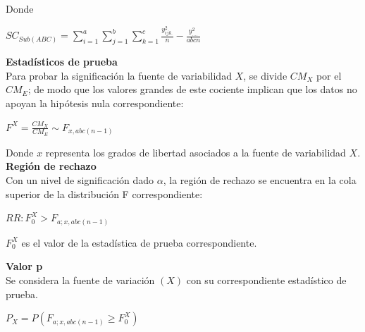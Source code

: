 Donde
\begin{center}
	$ SC_{Sub(ABC)} = \sum_{i=1}^{a}  \sum_{j=1}^{b}  \sum_{k=1}^{c} \frac{y_{ijk.}^{2}}{n} - \frac{y_{....}^{2}}{abcn}  $\\
\end{center}


\textbf{Estadísticos de prueba}\\
Para probar la significación la fuente de variabilidad $X$, se divide $CM_{X}$ por el  $CM_{E}$; de modo que los valores grandes de este cociente implican que los datos no apoyan la hipótesis nula correspondiente:
\begin{center}
	$ F^{X} = \frac{CM_{X}}{CM_{E}} \sim F_{x,abc(n-1)}  $\\
\end{center}


Donde $x$ representa los grados de libertad asociados a la fuente de variabilidad $X$.\\

\textbf{Región de rechazo}\\

Con un nivel de significación dado $\alpha$, la región de rechazo se encuentra en la cola superior de la distribución F correspondiente:

\begin{center}
	$ RR : F_{0}^{X} > F_{a;x,abc(n-1)} $\\
\end{center}

$ F_{0}^{X} $ es el valor de la estadística de prueba correspondiente.

\textbf{Valor p}\\

Se considera la fuente de variación $(X)$ con su correspondiente estadístico de prueba.

\begin{center}
	$ P_{X} =  P( F_{a;x,abc(n-1)} \geq F_{0}^{X} ) $\\
\end{center}


